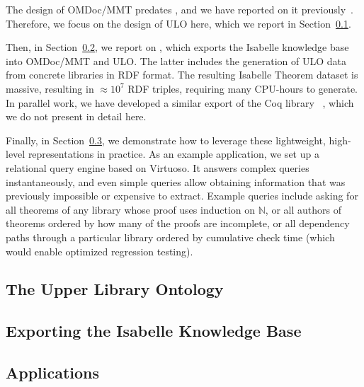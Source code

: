 The design of OMDoc/MMT predates \pn, and we have reported on it previously~\cite{Kohlhase:OMDoc1.2,RabKoh:WSMSML13,DehKohKon:iop16,KohMuePfe:kbimss17}.
Therefore, we focus on the design of ULO here, which we report in Section~\ref{sec:ulo}.

Then, in Section~\ref{sec:isabelle}, we report on , which exports the Isabelle knowledge base into OMDoc/MMT and ULO.  The latter includes the generation of ULO data from concrete libraries in RDF format.  The resulting Isabelle Theorem dataset is massive, resulting in  $\approx 10^7$ RDF triples, requiring many CPU-hours to generate.  In parallel work, we have developed a similar export of the Coq library ~\cite{MueRabSac:cltg19}, which we do not present in detail here.

Finally, in Section~\ref{sec:uloappl}, we demonstrate how to leverage these lightweight, high-level representations in practice.
As an example application, we set up a relational query engine based on Virtuoso.
It answers complex queries instantaneously, and even simple queries allow obtaining information that was previously impossible or expensive to extract.
Example queries include asking for all theorems of any library whose proof uses induction on $\mathbb{N}$,
or all authors of theorems ordered by how many of the proofs are incomplete,
or all dependency paths through a particular library ordered by cumulative check time (which would enable optimized regression testing).

\subsection{The Upper Library Ontology}\label{sec:ulo}


\subsection{Exporting the Isabelle Knowledge Base}\label{sec:isabelle}


\subsection{Applications}\label{sec:uloappl}



